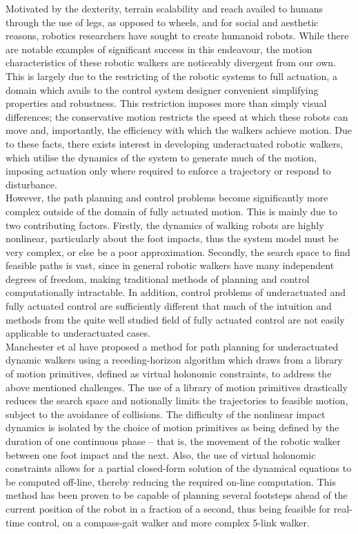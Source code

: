 Motivated by the dexterity, terrain scalability and reach availed to humans through the use of legs, as opposed to wheels, and for social and aesthetic reasons, robotics researchers have sought to create humanoid robots. While there are notable examples of significant success in this endeavour, the motion characteristics of these robotic walkers are noticeably divergent from our own. This is largely due to the restricting of the robotic systems to full actuation, a domain which avails to the control system designer convenient simplifying properties and robustness. This restriction imposes more than simply visual differences; the conservative motion restricts the speed at which these robots can move and, importantly, the efficiency with which the walkers achieve motion. Due to these facts, there exists interest in developing underactuated robotic walkers, which utilise the dynamics of the system to generate much of the motion, imposing actuation only where required to enforce a trajectory or respond to disturbance. \\

However, the path planning and control problems become significantly more complex outside of the domain of fully actuated motion. This is mainly due to two contributing factors. Firstly, the dynamics of walking robots are highly nonlinear, particularly about the foot impacts, thus the system model must be very complex, or else be a poor approximation. Secondly, the search space to find feasible paths is vast, since in general robotic walkers have many independent degrees of freedom, making traditional methods of planning and control computationally intractable. In addition, control problems of underactuated and fully actuated control are sufficiently different that much of the intuition and methods from the quite well studied field of fully actuated control are not easily applicable to underactuated cases. \\

Manchester et al \cite{manchester13planning} have proposed a method for path planning for underactuated dynamic walkers using a receding-horizon algorithm which draws from a library of motion primitives, defined as virtual holonomic constraints, to address the above mentioned challenges. The use of a library of motion primitives drastically reduces the search space and notionally limits the trajectories to feasible motion, subject to the avoidance of collisions. The difficulty of the nonlinear impact dynamics is isolated by the choice of motion primitives as being defined by the duration of one continuous phase – that is, the movement of the robotic walker between one foot impact and the next. Also, the use of virtual holonomic constraints allows for a partial closed-form solution of the dynamical equations to be computed off-line, thereby reducing the required on-line computation. This method has been proven to be capable of planning several footsteps ahead of the current position of the robot in a fraction of a second, thus being feasible for real-time control, on a compass-gait walker and more complex 5-link walker. \\

